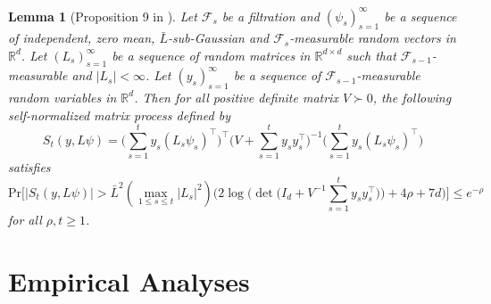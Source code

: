 \documentclass[11pt]{article}
\theoremstyle{plain}
\newtheorem{lem}[thm]{Lemma}
\theoremstyle{definition}
\theoremstyle{remark}
\newcommand{\R}{\mathbb{R}}
\begin{document}
\begin{lem}[Proposition 9 in \cite{jedra2022minimal}]\label{lem:self-normalized_matrix}
Let $\mathcal{F}_s$ be a filtration and $(\psi_s)_{s=1}^{\infty}$ be a sequence of independent, zero mean, $\bar L$-sub-Gaussian and $\mathcal{F}_{s}$-measurable random vectors in $\R^{d}$. Let $(L_s)_{s=1}^{\infty}$ be a sequence of random matrices in $\R^{d\times d}$ such that $\mathcal{F}_{s-1}$-measurable and $|L_s|<\infty$. Let $(y_s)_{s=1}^{\infty}$ be a sequence of $\mathcal{F}_{s-1}$-measurable random variables in $\R^{d}$. Then for all positive definite matrix $V\succ 0$, the following self-normalized matrix process defined by 
\[
S_t(y,L\psi) = \bigg (\sum_{s=1}^t y_s (L_s \psi_s)^{\top}\bigg)^{\top} \bigg(V+\sum_{s=1}^ty_sy_s^{\top}\bigg)^{-1}\bigg (\sum_{s=1}^t y_s(L_s \psi_s)^{\top}\bigg )
\]
satisfies
\[
\mathrm{Pr}\bigg[|S_t(y,L\psi)|>\bar{L}^2(\max_{1\leq s \leq t}|L_s|^2)\bigg(2\log \bigg(\det\bigg(I_d+V^{-1}\sum_{s=1}^ty_sy_s^{\top} \bigg)\bigg)+ 4\rho +7d\bigg)\bigg] \leq e^{-\rho}
\]
for all $\rho,t \geq 1$.
\end{lem}


\section{Empirical Analyses}\label{app:exp}
\end{document}
